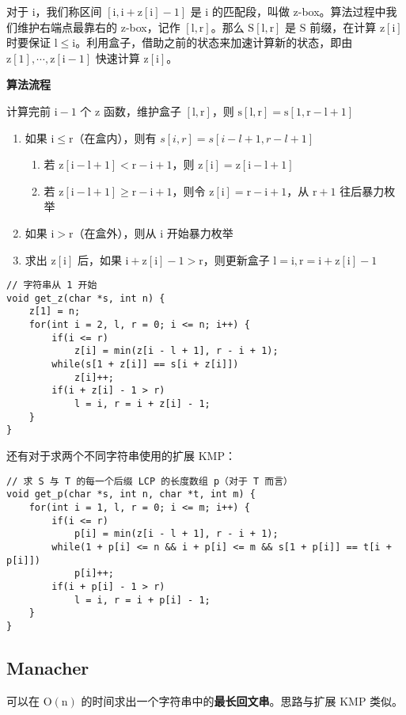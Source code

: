 \documentclass[UTF8]{article}
\begin{document}
对于 $\mathrm{i}$，我们称区间 $\mathrm{[i, i + z[i] - 1]}$ 是 $\mathrm{i}$ 的匹配段，叫做 z-box。算法过程中我们维护右端点最靠右的 z-box，记作 $\mathrm{[l, r]}$。那么 $\mathrm{S[l, r]}$ 是 $\mathrm{S}$ 前缀，在计算 $\mathrm{z[i]}$ 时要保证 $\mathrm{l \le i}$。利用盒子，借助之前的状态来加速计算新的状态，即由 $\mathrm{z[1], \cdots, z[i - 1]}$ 快速计算 $\mathrm{z[i]}$。

\noindent \textbf{算法流程}

计算完前 $\mathrm{i - 1}$ 个 $\mathrm{z}$ 函数，维护盒子 $\mathrm{[l, r]}$，则 $\mathrm{s[l, r] = s[1, r - l + 1]}$

\begin{enumerate}
	\item 如果 $\mathrm{i \le r}$（在盒内），则有 $s[i, r] = s[i - l + 1, r - l + 1]$		
	\begin{enumerate}
		\item 若 $\mathrm{z[i - l + 1] < r - i + 1}$，则 $\mathrm{z[i] = z[i - l +1]}$
		\item 若 $\mathrm{z[i - l + 1] \ge r - i + 1}$，则令 $\mathrm{z[i] = r - i + 1}$，从 $\mathrm{r + 1}$ 往后暴力枚举
	\end{enumerate}
	\item 如果 $\mathrm{i > r}$（在盒外），则从 $\mathrm{i}$ 开始暴力枚举
	\item 求出 $\mathrm{z[i]}$ 后，如果 $\mathrm{i + z[i] - 1 > r}$，则更新盒子 $\mathrm{l = i, r = i + z[i] - 1}$
\end{enumerate}

\begin{lstlisting}[caption=扩展 KMP]
// 字符串从 1 开始
void get_z(char *s, int n) {
	z[1] = n;
	for(int i = 2, l, r = 0; i <= n; i++) {
		if(i <= r)
			z[i] = min(z[i - l + 1], r - i + 1);
		while(s[1 + z[i]] == s[i + z[i]])
			z[i]++;
		if(i + z[i] - 1 > r)
			l = i, r = i + z[i] - 1;
	}
}
\end{lstlisting}

还有对于求两个不同字符串使用的扩展 KMP：
\begin{lstlisting}[caption=扩展 KMP]
// 求 S 与 T 的每一个后缀 LCP 的长度数组 p（对于 T 而言）
void get_p(char *s, int n, char *t, int m) {
	for(int i = 1, l, r = 0; i <= m; i++) {
		if(i <= r)
			p[i] = min(z[i - l + 1], r - i + 1);
		while(1 + p[i] <= n && i + p[i] <= m && s[1 + p[i]] == t[i + p[i]])
			p[i]++;
		if(i + p[i] - 1 > r)
			l = i, r = i + p[i] - 1;
	}
}
\end{lstlisting}


\subsection{Manacher}
可以在 $\mathrm{O(n)}$ 的时间求出一个字符串中的\textbf{最长回文串}。思路与扩展 KMP 类似。
\end{document}
